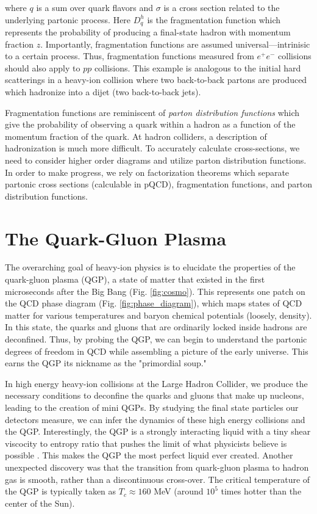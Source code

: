 \documentclass[../main.tex]{subfiles}
\begin{document}
where $q$ is a sum over quark flavors and $\sigma$ is a cross section related to the underlying partonic process. Here $D_q^h$ is the fragmentation function which represents the probability of producing a final-state hadron with momentum fraction $z$. Importantly, fragmentation functions are assumed universal---intrinisic to a certain process. Thus, fragmentation functions measured from $e^+e^-$ collisions should also apply to $pp$ collisions. This example is analogous to the initial hard scatterings in a heavy-ion collision where two back-to-back partons are produced which hadronize into a dijet (two back-to-back jets). 

Fragmentation functions are reminiscent of \textit{parton distribution functions} which give the probability of observing a quark within a hadron as a function of the momentum fraction of the quark. At hadron colliders, a description of hadronization is much more difficult. To accurately calculate cross-sections, we need to consider higher order diagrams and utilize parton distribution functions. In order to make progress, we rely on factorization theorems which separate partonic cross sections (calculable in pQCD), fragmentation functions, and parton distribution functions. 


\section{The Quark-Gluon Plasma}
The overarching goal of heavy-ion physics is to elucidate the properties of the quark-gluon plasma (QGP), a state of matter that existed in the first microseconds after the Big Bang (Fig. \ref{fig:cosmo}). This represents one patch on the QCD phase diagram (Fig. \ref{fig:phase_diagram}), which maps states of QCD matter for various temperatures and baryon chemical potentials (loosely, density). In this state, the quarks and gluons that are ordinarily locked inside hadrons are deconfined. Thus, by probing the QGP, we can begin to understand the partonic degrees of freedom in QCD while assembling a picture of the early universe. This earns the QGP its nickname as the "primordial soup."

In high energy heavy-ion collisions at the Large Hadron Collider, we produce the necessary conditions to deconfine the quarks and gluons that make up nucleons, leading to the creation of mini QGPs. By studying the final state particles our detectors measure, we can infer the dynamics of these high energy collisions and the QGP. Interestingly, the QGP is a strongly interacting liquid with a tiny shear viscocity to entropy ratio that pushes the limit of what physicists believe is possible \cite{Busza:2018rrf}. This makes the QGP the most perfect liquid ever created. Another unexpected discovery was that the transition from quark-gluon plasma to hadron gas is smooth, rather than a discontinuous cross-over. The critical temperature of the QGP is typically taken as $T_c \approx 160$ MeV (around $10^5$ times hotter than the center of the Sun).
\end{document}
